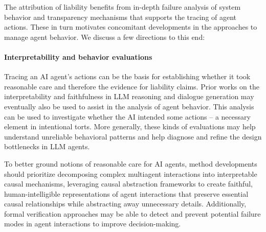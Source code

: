 \documentclass[11pt]{article}
\begin{document}
The attribution of liability benefits from in-depth failure analysis of system behavior and transparency mechanisms that supports the tracing of agent actions. These in turn motivates concomitant developments in the approaches to manage agent behavior. We discuss a few directions to this end: 


\paragraph{Interpretability and behavior evaluations} Tracing an AI agent's actions \citep{lu_agentlens_2024} can be the basis for establishing whether it took reasonable care \citep{price_potential_2019,choi_software_2020} and therefore the evidence for liability claims. Prior works on the interpretability and faithfulness in LLM reasoning \cite{lyu_faithful_2023,wei_jie_how_2024} and dialogue generation \citep{tuan_local_2021} may eventually also be used to assist in the analysis of agent behavior. This analysis can be used to investigate whether the AI intended some actions -- a necessary element in intentional torts.  More generally, these kinds of evaluations may help understand unreliable behavioral patterns and help diagnose and refine the design bottlenecks in LLM agents. 


To better ground notions of reasonable care for AI agents, method developments should prioritize decomposing complex multiagent interactions into interpretable causal mechanisms, leveraging causal abstraction frameworks \cite{geiger_causal_2024} to create faithful, human-intelligible representations of agent interactions that preserve essential causal relationships while abstracting away unnecessary details.
Additionally, formal verification approaches \citep{zhang_fusion_2024} may be able to detect and prevent potential failure modes in agent interactions to improve decision-making.

\end{document}
